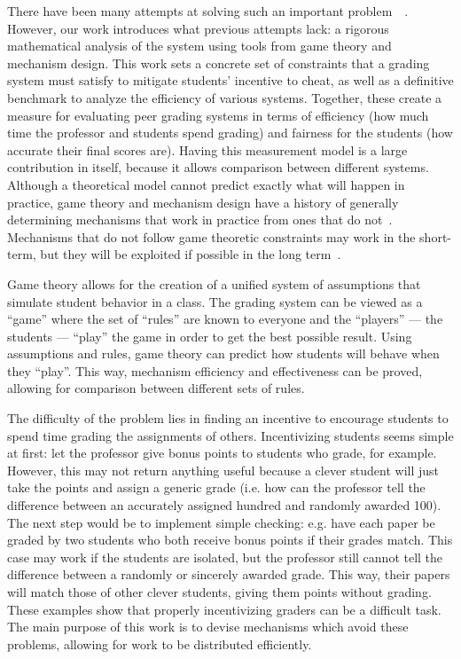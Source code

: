 \documentclass[12pt, Arial]{article}
\begin{document}
There have been many attempts at solving such an important problem~\cite{autograding}~\cite{edxsoftware}. However, our work introduces what previous attempts lack: a rigorous mathematical analysis of the system using tools from game theory and mechanism design. This work sets a concrete set of constraints that a grading system must satisfy to mitigate students' incentive to cheat, as well as a definitive benchmark to analyze the efficiency of various systems. Together, these create a measure for evaluating peer grading systems in terms of efficiency (how much time the professor and students spend grading) and fairness for the students (how accurate their final scores are). Having this measurement model is a large contribution in itself, because it allows comparison between different systems. Although a theoretical model cannot predict exactly what will happen in practice, game theory and mechanism design have a history of generally determining mechanisms that work in practice from ones that do not~\cite{AGTbook}. Mechanisms that do not follow game theoretic constraints may work in the short-term, but they will be exploited if possible in the long term~\cite{boycottfinal}.

Game theory allows for the creation of a unified system of assumptions that simulate student behavior in a class. The grading system can be viewed as a ``game'' where the set of ``rules'' are known to everyone and the ``players'' --- the students --- ``play'' the game in order to get the best possible result. Using assumptions and rules, game theory can predict how students will behave when they ``play''. This way, mechanism efficiency and effectiveness can be proved, allowing for comparison between different sets of rules.

The difficulty of the problem lies in finding an incentive to encourage students to spend time grading the assignments of others. Incentivizing students seems simple at first: let the professor give bonus points to students who grade, for example. However, this may not return anything useful because a clever student will just take the points and assign a generic grade (i.e. how can the professor tell the difference between an accurately assigned hundred and randomly awarded 100). The next step would be to implement simple checking: e.g. have each paper be graded by two students who both receive bonus points if their grades match. This case may work if the students are isolated, but the professor still cannot tell the difference between a randomly or sincerely awarded grade. This way, their papers will match those of other clever students, giving them points without grading. These examples show that properly incentivizing graders can be a difficult task. The main purpose of this work is to devise mechanisms which avoid these problems, allowing for work to be distributed efficiently.
\end{document}
